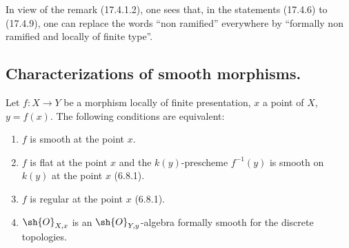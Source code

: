 \begin{remark}[17.4.10]
\label{IV.17.4.10}
In view of the remark (17.4.1.2), one sees that, in the statements (17.4.6) to (17.4.9), one can replace the words ``non ramified'' everywhere by ``formally non ramified and locally of finite type''.
\end{remark}

\subsection{Characterizations of smooth morphisms.}
\label{subsection:IV.17.5}


\begin{theorem}[17.5.1]
\label{IV.17.5.1}
Let $f:X\to Y$ be a morphism locally of finite presentation, $x$ a point of $X$, $y=f(x)$.
The following conditions are equivalent:
\begin{enumerate}[label=(\alph*)]
  \item $f$ is smooth at the point $x$.
  \item $f$ is flat at the point $x$ and the $k(y)$-prescheme $f^{-1}(y)$ is smooth on $k(y)$ at the point $x$ (6.8.1).
  \item[b')] $f$ is regular at the point $x$ (6.8.1).
  \item $\sh{O}_{X,x}$ is an $\sh{O}_{Y,y}$-algebra formally smooth for the discrete topologies.
\end{enumerate}
\end{theorem}


